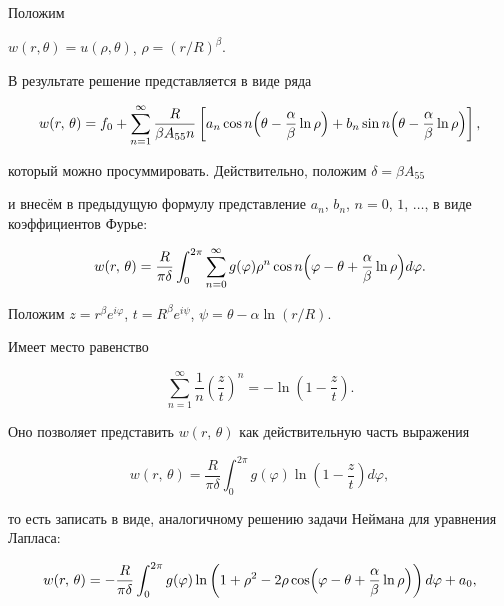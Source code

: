 Положим

$w(r,\theta)=u(\rho,\theta)$, $\rho=({r}/{R} )^\beta.

$

В результате решение представляется в виде ряда

\[

w(r,\,\theta)=f_0+ \sum_{n=1}^\infty \dfrac{R}{\beta A_{55} n}\left[a_n\cos n \Bigl(\theta-

\dfrac{\alpha}{\beta}\ln\rho \Bigr) +b_n\sin n \Bigl(\theta-\dfrac{\alpha}{\beta}\ln\rho \Bigr) \right],

\]

который можно просуммировать. Действительно, положим $\delta =\beta A_{55}$

и внесём в предыдущую формулу представление  $a_n$, $b_n$, $n=0$, $1$, $\ldots $, в виде коэффициентов Фурье:

\[

w(r,\,\theta) = \dfrac{R}{\pi \delta} \int_{0}^{2\pi} \sum_{n=0}^\infty g(\varphi) \rho^n

\cos n\Bigl( \varphi -\theta + \dfrac{\alpha}{\beta}\ln \rho\Bigr) d\varphi.

\]



Положим $z=r^\beta e^{i \varphi}$, $t= R^\beta e^{i \psi}$, $\psi= \theta -\alpha \ln(r/R)$.

 Имеет место равенство

\[

 \sum_{n=1}^\infty \dfrac{1}{n}\left(\dfrac{z}{t} \right)^n = - \ln \left(1- \dfrac{z}{t} \right).

\]

Оно позволяет представить $w(r,\,\theta)$ как действительную часть выражения

\begin{equation}

\label{bogan:eq11}

w(r,\,\theta)= \dfrac{R}{\pi \delta}\int_{0}^{2 \pi}g(\varphi)\ln \left(1-\dfrac{z}{t}\right)d\varphi,

\end{equation}

то есть записать в виде, аналогичному решению задачи Неймана для уравнения Лапласа:

\begin{equation}

\label{bogan:eq12}

w(r,\,\theta) = - \dfrac{R}{\pi \delta} \int_{0}^{2\pi} g(\varphi)

\ln \left(1+\rho^2 -2\rho \cos\Bigl(\varphi -\theta + \dfrac{\alpha}{\beta} \ln \rho\Bigr) \right)d\varphi + a_0,

\end{equation}

